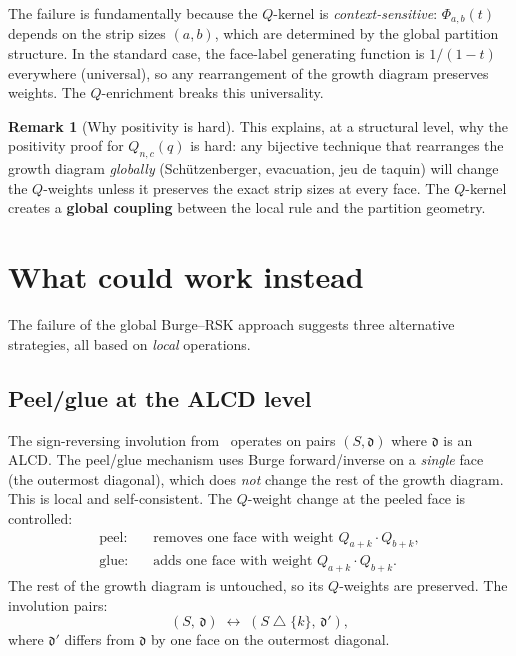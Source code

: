 \documentclass[11pt]{article}
\theoremstyle{plain}
\theoremstyle{definition}
\newtheorem{remark}[theorem]{Remark}
\begin{document}
The failure is fundamentally because the $Q$-kernel is
\emph{context-sensitive}: $\Phi_{a,b}(t)$ depends on the strip
sizes $(a,b)$, which are determined by the global partition
structure.  In the standard case, the face-label generating
function is $1/(1-t)$ everywhere (universal), so any
rearrangement of the growth diagram preserves weights.  The
$Q$-enrichment breaks this universality.

\begin{remark}[Why positivity is hard]
\label{rem:hard}
This explains, at a structural level, why the positivity proof for
$Q_{n,c}(q)$ is hard: any bijective technique that rearranges the
growth diagram \emph{globally} (Sch\"utzenberger, evacuation, jeu
de taquin) will change the $Q$-weights unless it preserves the
exact strip sizes at every face.  The $Q$-kernel creates a
\textbf{global coupling} between the local rule and the partition
geometry.
\end{remark}


\section{What could work instead}
\label{sec:alternatives}

The failure of the global Burge--RSK approach suggests three
alternative strategies, all based on \emph{local} operations.


\subsection{Peel/glue at the ALCD level}

The sign-reversing involution from~\cite{FIRST_ATTEMPT} operates
on pairs $(S, \mathfrak{d})$ where $\mathfrak{d}$ is an ALCD.
The peel/glue mechanism uses Burge forward/inverse on a
\emph{single} face (the outermost diagonal), which does
\emph{not} change the rest of the growth diagram.  This is local
and self-consistent.  The $Q$-weight change at the peeled face is
controlled:
\begin{align*}
  \text{peel:} &\quad \text{removes one face with weight }
    Q_{a+k} \cdot Q_{b+k}, \\
  \text{glue:} &\quad \text{adds one face with weight }
    Q_{a+k} \cdot Q_{b+k}.
\end{align*}
The rest of the growth diagram is untouched, so its $Q$-weights
are preserved.  The involution pairs:
\[
  (S,\, \mathfrak{d})
  \;\longleftrightarrow\;
  (S \mathbin{\triangle} \{k\},\, \mathfrak{d}'),
\]
where $\mathfrak{d}'$ differs from $\mathfrak{d}$ by one face on
the outermost diagonal.
\end{document}
